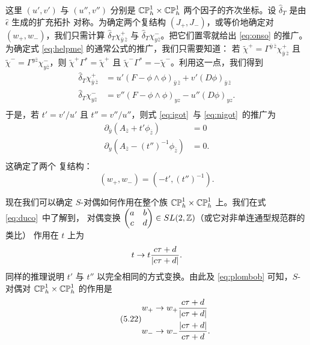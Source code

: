 这里 $(u',v')$ 与 $(u'',v'')$ 分别是 $\Bbb{CP}^1_h\times
\Bbb{CP}^1_h$ 两个因子的齐次坐标。设 $\hat\delta_T$ 是由 $\hat \epsilon$ 生成的扩充拓扑
对称。为确定两个复结构 $(J_+,J_-)$，或等价地确定对
$(w_+,w_-)$，我们只需计算
$\hat\delta_T\chi^+_{\bar y\,\bar z}$ 与
$\hat\delta_T\chi^-_{y\bar z}$。把它们置零就给出
\eqref{eq:onso} 的推广。为确定式 \eqref{eq:helpme} 的通常公式的推广，我们只需要知道：
若 $\tilde\chi^+=\Gamma^{\bar y\,\bar z}\chi^+_{\bar y\,\bar z}$
且 $\tilde\chi^-=\Gamma^{y\bar z}\chi^-_{y\bar z}$，则
$\tilde\chi^+\Gamma^*=\tilde\chi^+$ 且
$\tilde\chi^-\Gamma^*=-\tilde\chi^-$。利用这一点，我们得到
\setcounter{equation}{17}
\begin{equation}\label{eq:qengo}
\begin{aligned}\hat\delta_T\chi^+_{\bar y\,\bar
z}&=u'(F-\phi\wedge\phi)_{\bar y\,\bar z}+v'(D\phi)_{\bar y\,\bar
z}\\ \hat\delta_T\chi^-_{ y \bar z}&=v''(F-\phi\wedge\phi)_{y
z}-u''(D\phi)_{yz}.\\\end{aligned}
\end{equation}
 于是，若 $t'=v'/u'$ 且
$t''=v''/u''$，则式 \eqref{eq:igot}\ 与
\eqref{eq:nigot}\ 的推广为 %
\setcounter{equation}{18}
\begin{equation}\label{eq:pokodo}
\begin{aligned}\partial_{\bar y}(A_{\bar
z}+t'\phi_{\bar z})&=0\\ \partial_y(A_{\bar
z}-(t'')^{-1}\phi_{\bar z})&=0 .\\\end{aligned}
\end{equation}
 这确定了两个
复结构： %
\setcounter{equation}{19}
\begin{equation}\label{eq:plombob}
(w_+,w_-)=(-t',(t'')^{-1}).
\end{equation}

现在我们可以确定 $S$-对偶如何作用在整个族
$\Bbb{CP}^1_h\times \Bbb{CP}^1_h$ 上。我们在式 \eqref{eq:duco}\ 中了解到，
对偶变换 $\left(\begin{matrix}a & b \\ c & d\end{matrix}\right)\in
SL(2,\Bbb{Z})$（或它对非单连通型规范群的类比）
作用在 $t$ 上为 %
\setcounter{equation}{20}
\begin{equation}\label{eq:utlo}
t\to t{c\tau+d\over
|c\tau+d|}.
\end{equation}
  同样的推理说明 $t'$ 与 $t''$
以完全相同的方式变换。由此及 \eqref{eq:plombob} 可知，$S$-对偶对 $\Bbb{CP}^1_h\times \Bbb{CP}^1_h$ 的作用是
\begin{equation*}
\tag*{(5.22)}
\begin{aligned}w_+ & \to w_+{c \tau+d\over
|c\tau+d|}\\
                   w_-  & \to w_-{|c\tau+d|\over c
                   \tau+d}.\\\end{aligned}
\end{equation*}

